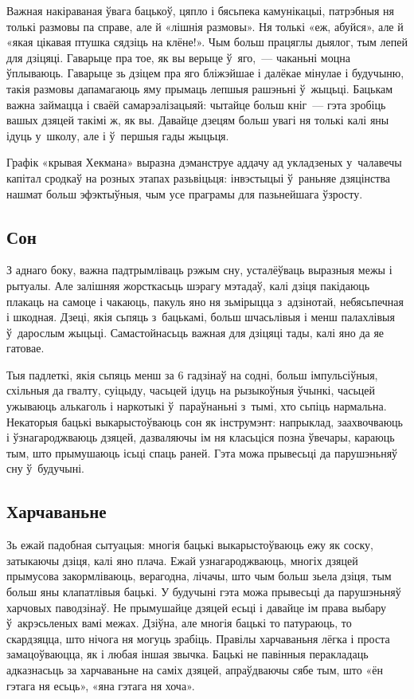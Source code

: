 Важная накіраваная ўвага бацькоў, цяпло і бясьпека камунікацыі, патрэбныя ня толькі размовы па справе, але й «лішнія размовы». Ня толькі «еж, абуйся», але й «якая цікавая птушка сядзіць на клёне!». Чым больш працяглы дыялог, тым лепей для дзіцяці. Гаварыце пра тое, як вы верыце ў~яго,~--- чаканьні моцна ўплываюць. Гаварыце зь дзіцем пра яго бліжэйшае і далёкае мінулае і будучыню, такія размовы дапамагаюць яму прымаць лепшыя рашэньні ў~жыцьці. Бацькам важна займацца і сваёй самарэалізацыяй: чытайце больш кніг~--- гэта зробіць вашых дзяцей такімі ж, як вы. Давайце дзецям больш увагі ня толькі калі яны ідуць у~школу, але і ў~першыя гады жыцьця. 

Графік «крывая Хекмана» выразна дэманструе аддачу ад укладзеных у~чалавечы капітал сродкаў на розных этапах разьвіцьця: інвэстыцыі ў~раньняе дзяцінства нашмат больш эфэктыўныя, чым усе праграмы для пазьнейшага ўзросту.

\subsection*{Сон}

З аднаго боку, важна падтрымліваць рэжым сну, усталёўваць выразныя межы і рытуалы. Але залішняя жорсткасьць шэрагу мэтадаў, калі дзіця пакідаюць плакаць на самоце і чакаюць, пакуль яно ня зьмірыцца з~адзінотай, небясьпечная і шкодная. Дзеці, якія сьпяць з~бацькамі, больш шчасьлівыя і менш палахлівыя ў~дарослым жыцьці. Самастойнасьць важная для дзіцяці тады, калі яно да яе гатовае.

Тыя падлеткі, якія сьпяць менш за 6 гадзінаў на содні, больш імпульсіўныя, схільныя да гвалту, суіцыду, часьцей ідуць на рызыкоўныя ўчынкі, часьцей ужываюць алькаголь і наркотыкі ў~параўнаньні з~тымі, хто сьпіць нармальна. Некаторыя бацькі выкарыстоўваюць сон як інструмэнт: напрыклад, заахвочваюць і ўзнагароджваюць дзяцей, дазваляючы ім ня класьціся позна ўвечары, караюць тым, што прымушаюць ісьці спаць раней. Гэта можа прывесьці да парушэньняў сну ў~будучыні.

\subsection*{Харчаваньне}

Зь ежай падобная сытуацыя: многія бацькі выкарыстоўваюць ежу як соску, затыкаючы дзіця, калі яно плача. Ежай узнагароджваюць, многіх дзяцей прымусова закормліваюць, верагодна, лічачы, што чым больш зьела дзіця, тым больш яны клапатлівыя бацькі. У будучыні гэта можа прывесьці да парушэньняў харчовых паводзінаў. Не прымушайце дзяцей есьці і давайце ім права выбару ў~акрэсьленых вамі межах. Дзіўна, але многія бацькі то патураюць, то скардзяцца, што нічога ня могуць зрабіць. Правілы харчаваньня лёгка і проста замацоўваюцца, як і любая іншая звычка. Бацькі не павінныя перакладаць адказнасьць за харчаваньне на саміх дзяцей, апраўдваючы сябе тым, што «ён гэтага ня есьць», «яна гэтага ня хоча».

